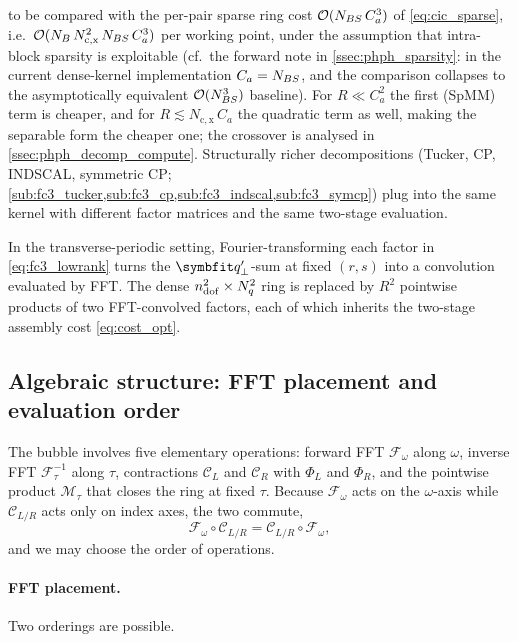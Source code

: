 to be compared with the per-pair sparse ring cost $\mathcal{O}(N_{BS}\,C_a^{3})$ of
\cref{eq:cic_sparse}, i.e.\
$\mathcal{O}(N_{B}\,N_\mathrm{c,x}^{2}\,N_{BS}\,C_a^{3})$ per working point,
under the assumption that intra-block
sparsity is exploitable (cf.\ the forward note in
\cref{ssec:phph_sparsity}: in the current dense-kernel
implementation $C_a=N_{BS}$, and the comparison collapses to the
asymptotically equivalent $\mathcal{O}(N_{BS}^{3})$ baseline). For
$R\ll C_a^{2}$ the first (SpMM) term is cheaper, and for
$R\lesssim N_\mathrm{c,x}\,C_a$ the quadratic term as well, making the
separable form the cheaper one; the crossover is analysed in
\cref{ssec:phph_decomp_compute}.
Structurally richer decompositions (Tucker, CP, INDSCAL, symmetric
CP; \cref{sub:fc3_tucker,sub:fc3_cp,sub:fc3_indscal,sub:fc3_symcp})
plug into the same kernel with different factor matrices and the
same two-stage evaluation.

In the transverse-periodic setting, Fourier-transforming each
factor in \cref{eq:fc3_lowrank} turns the $\qp'$-sum at fixed
$(r,s)$ into a convolution evaluated by FFT. The dense
$n_{\mathrm{dof}}^{2}\times N_q^{2}$ ring is replaced by $R^{2}$ pointwise
products of two FFT-convolved factors, each of which inherits the
two-stage assembly cost \cref{eq:cost_opt}.

\subsection{Algebraic structure: FFT placement and evaluation order}
\label{ssec:phph_algebra}

The bubble involves five elementary operations: forward FFT
$\mathcal{F}_\omega$ along $\omega$, inverse FFT
$\mathcal{F}^{-1}_\tau$ along $\tau$, contractions $\mathcal{C}_L$
and $\mathcal{C}_R$ with $\Phi_L$ and $\Phi_R$, and the pointwise
product $\mathcal{M}_\tau$ that closes the ring at fixed $\tau$.
Because $\mathcal{F}_\omega$ acts on the $\omega$-axis while
$\mathcal{C}_{L/R}$ acts only on index axes, the two commute,
\begin{equation}\label{eq:fft_contraction_commute}
  \mathcal{F}_\omega\circ\mathcal{C}_{L/R}
  = \mathcal{C}_{L/R}\circ\mathcal{F}_\omega,
\end{equation}
and we may choose the order of operations.

\paragraph{FFT placement.} Two orderings are possible.

